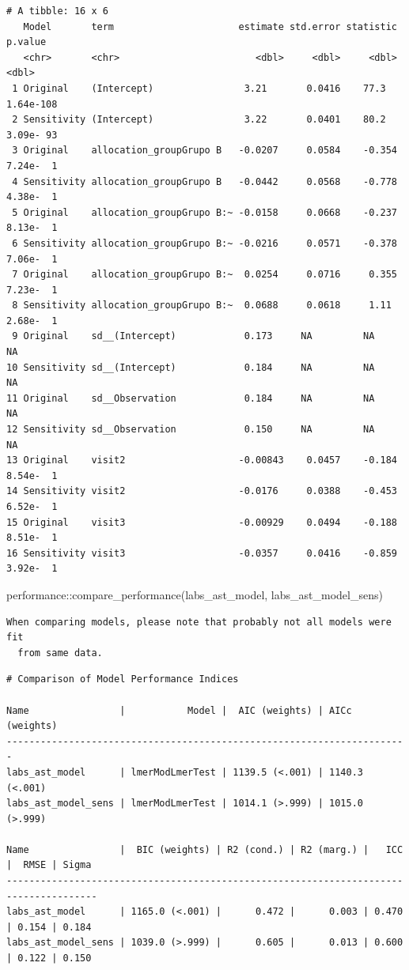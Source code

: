 \documentclass[
  letterpaper,
  DIV=11,
  numbers=noendperiod]{scrartcl}
\newenvironment{Shaded}{\begin{snugshade}}{\end{snugshade}}
\newcommand{\FunctionTok}[1]{\textcolor[rgb]{0.28,0.35,0.67}{#1}}
\newcommand{\NormalTok}[1]{\textcolor[rgb]{0.00,0.23,0.31}{#1}}
\newcommand{\SpecialCharTok}[1]{\textcolor[rgb]{0.37,0.37,0.37}{#1}}
\begin{document}
\begin{verbatim}
# A tibble: 16 x 6
   Model       term                      estimate std.error statistic    p.value
   <chr>       <chr>                        <dbl>     <dbl>     <dbl>      <dbl>
 1 Original    (Intercept)                3.21       0.0416    77.3    1.64e-108
 2 Sensitivity (Intercept)                3.22       0.0401    80.2    3.09e- 93
 3 Original    allocation_groupGrupo B   -0.0207     0.0584    -0.354  7.24e-  1
 4 Sensitivity allocation_groupGrupo B   -0.0442     0.0568    -0.778  4.38e-  1
 5 Original    allocation_groupGrupo B:~ -0.0158     0.0668    -0.237  8.13e-  1
 6 Sensitivity allocation_groupGrupo B:~ -0.0216     0.0571    -0.378  7.06e-  1
 7 Original    allocation_groupGrupo B:~  0.0254     0.0716     0.355  7.23e-  1
 8 Sensitivity allocation_groupGrupo B:~  0.0688     0.0618     1.11   2.68e-  1
 9 Original    sd__(Intercept)            0.173     NA         NA     NA        
10 Sensitivity sd__(Intercept)            0.184     NA         NA     NA        
11 Original    sd__Observation            0.184     NA         NA     NA        
12 Sensitivity sd__Observation            0.150     NA         NA     NA        
13 Original    visit2                    -0.00843    0.0457    -0.184  8.54e-  1
14 Sensitivity visit2                    -0.0176     0.0388    -0.453  6.52e-  1
15 Original    visit3                    -0.00929    0.0494    -0.188  8.51e-  1
16 Sensitivity visit3                    -0.0357     0.0416    -0.859  3.92e-  1
\end{verbatim}

\begin{Shaded}
\begin{Highlighting}[]
\NormalTok{performance}\SpecialCharTok{::}\FunctionTok{compare\_performance}\NormalTok{(labs\_ast\_model, labs\_ast\_model\_sens)}
\end{Highlighting}
\end{Shaded}

\begin{verbatim}
When comparing models, please note that probably not all models were fit
  from same data.
\end{verbatim}

\begin{verbatim}
# Comparison of Model Performance Indices

Name                |           Model |  AIC (weights) | AICc (weights)
-----------------------------------------------------------------------
labs_ast_model      | lmerModLmerTest | 1139.5 (<.001) | 1140.3 (<.001)
labs_ast_model_sens | lmerModLmerTest | 1014.1 (>.999) | 1015.0 (>.999)

Name                |  BIC (weights) | R2 (cond.) | R2 (marg.) |   ICC |  RMSE | Sigma
--------------------------------------------------------------------------------------
labs_ast_model      | 1165.0 (<.001) |      0.472 |      0.003 | 0.470 | 0.154 | 0.184
labs_ast_model_sens | 1039.0 (>.999) |      0.605 |      0.013 | 0.600 | 0.122 | 0.150
\end{verbatim}
\end{document}
